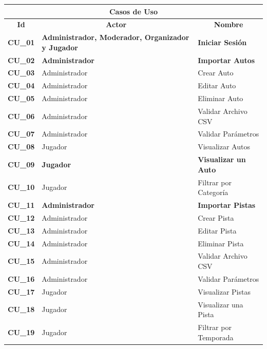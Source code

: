 \begin{center}
  \begin{tabular}{| p{1.5cm} | p{6.5cm} | p{5.5cm} |}
    \hline
    \multicolumn{3}{|c|}{\textbf{Casos de Uso}} \\
    \hline
    \multicolumn{1}{|c|}{\textbf{Id}} & \multicolumn{1}{|c|}{\textbf{Actor}} & \multicolumn{1}{|c|}{\textbf{Nombre}}\\
    \hline
    
    {\textbf{CU\_01}} & \textbf{Administrador, Moderador, Organizador y Jugador} & \textbf{Iniciar Sesión}\\ \hline
    
    {\textbf{CU\_02}} & \textbf{Administrador} & \textbf{Importar Autos}\\ \hline
    {\textbf{CU\_03}} & Administrador & Crear Auto\\ \hline
    {\textbf{CU\_04}} & Administrador & Editar Auto \\\hline
    {\textbf{CU\_05}} & Administrador & Eliminar Auto\\ \hline
    {\textbf{CU\_06}} & Administrador & Validar Archivo CSV\\ \hline
    {\textbf{CU\_07}} & Administrador & Validar Parámetros\\ \hline
    
    {\textbf{CU\_08}} & Jugador & Visualizar Autos\\ \hline
    {\textbf{CU\_09}} & \textbf{Jugador} & \textbf{Visualizar un Auto}\\ \hline
    {\textbf{CU\_10}} & Jugador & Filtrar por Categoría\\ \hline
    
    {\textbf{CU\_11}} & \textbf{Administrador} & \textbf{Importar Pistas}\\ \hline
    {\textbf{CU\_12}} & Administrador & Crear Pista\\ \hline
    {\textbf{CU\_13}} & Administrador & Editar Pista\\\hline
    {\textbf{CU\_14}} & Administrador & Eliminar Pista\\ \hline
    {\textbf{CU\_15}} & Administrador & Validar Archivo CSV\\ \hline
    {\textbf{CU\_16}} & Administrador & Validar Parámetros\\ \hline
    
    {\textbf{CU\_17}} & Jugador & Visualizar Pistas\\ \hline
    {\textbf{CU\_18}} & Jugador & Visualizar una Pista\\ \hline
    {\textbf{CU\_19}} & Jugador & Filtrar por Temporada\\ \hline
    

\end{tabular}
\end{center}
